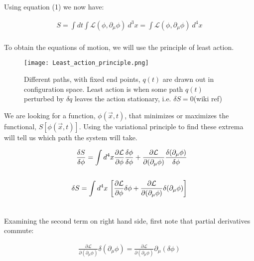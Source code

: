 \documentclass[aps,secnumarabic,nobalancelastpage,amsmath,amssymb,
nofootinbib]{revtex4}
\newcommand{\Lagr}{\mathcal{L}}
\begin{document}
\noindent Using equation (1) we now have:

\begin{equation}
\begin{split}
S = \int dt \int \Lagr(\phi,\partial_{\mu}\phi) \ d^3 x = \int \Lagr(\phi,\partial_{\mu}\phi) \ d^4 x\\
\, \label{eq:third-equation}
\end{split}
\end{equation}

\noindent To obtain the equations of motion, we will use the principle of least action. \\

\begin{figure}[h]
\texttt{[image: Least\_action\_principle.png]}
\caption{Different paths, with fixed end points, $q(t)$ are drawn out in configuration space. Least action is when some path $q(t)$ perturbed by $\delta q$ leaves the action stationary, i.e. $\delta S = 0$(wiki ref) }
\label{fig:LeastAction}
\end{figure}

We are looking for a function, $ \phi(\vec{x},t)$, that minimizes or maximizes the functional, $S[\phi(\vec{x},t)]$. Using the variational principle to find these extrema will tell us which path the system will take.

\begin{equation}
\begin{aligned}
\frac{\delta S}{\delta \phi} = \int d^4 x \frac{\partial \Lagr}{\partial \phi} \frac{\delta \phi}{\delta \phi} + \frac{\partial \Lagr}{\partial(\partial_\mu \phi)} \frac{\delta(\partial_\mu \phi)}{\delta \phi}
\\\\
 \delta S = \int d^4 x \ \bigg[ \normalfont \frac{ \partial \Lagr}{ \partial \phi} \delta \phi+\frac{ \partial \Lagr}{ \partial (\partial_\mu \phi) } \delta (\partial_\mu \phi)\bigg]\\
\, \label{eq:fourth-equation}
\end{aligned}
\end{equation}

\noindent Examining the second term on right hand side, first note that partial derivatives commute:

\begin{equation}
\begin{split}
\frac{ \partial \Lagr}{ \partial (\partial_\mu \phi) } \delta (\partial_\mu \phi) = \frac{ \partial \Lagr}{ \partial (\partial_\mu \phi) }  \partial_\mu (\delta \phi) \\
\, \label{eq:fifth-equation}
\end{split}
\end{equation}
\end{document}
